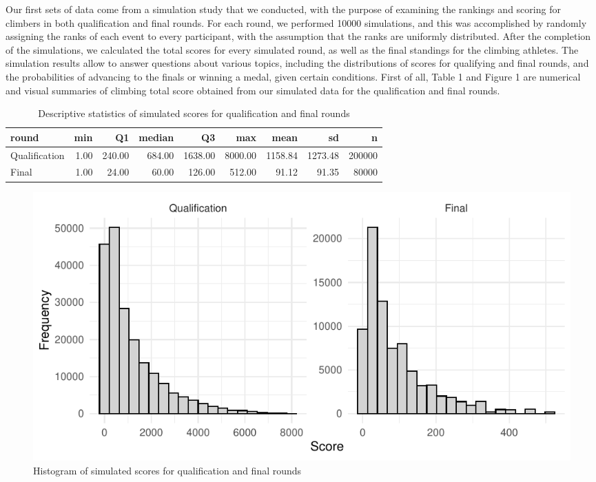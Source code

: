 \documentclass[12pt]{article}
\begin{document}
Our first sets of data come from a simulation study that we conducted,
with the purpose of examining the rankings and scoring for climbers in
both qualification and final rounds. For each round, we performed 10000
simulations, and this was accomplished by randomly assigning the ranks
of each event to every participant, with the assumption that the ranks
are uniformly distributed. After the completion of the simulations, we
calculated the total scores for every simulated round, as well as the
final standings for the climbing athletes. The simulation results allow
to answer questions about various topics, including the distributions of
scores for qualifying and final rounds, and the probabilities of
advancing to the finals or winning a medal, given certain conditions.
First of all, Table 1 and Figure 1 are numerical and visual summaries of
climbing total score obtained from our simulated data for the
qualification and final rounds.

\begin{table}[ht]
\centering
\caption{Descriptive statistics of simulated scores for qualification and final rounds} 
\begin{tabular}{lrrrrrrrr}
  \hline
round & min & Q1 & median & Q3 & max & mean & sd & n \\ 
  \hline
Qualification & 1.00 & 240.00 & 684.00 & 1638.00 & 8000.00 & 1158.84 & 1273.48 & 200000 \\ 
  Final & 1.00 & 24.00 & 60.00 & 126.00 & 512.00 & 91.12 & 91.35 & 80000 \\ 
   \hline
\end{tabular}
\end{table}

\begin{figure}[H]
\centering
\includegraphics{draft_files/figure-latex/unnamed-chunk-5-1.pdf}
\caption{Histogram of simulated scores for qualification and final
rounds}
\end{figure}
\end{document}
